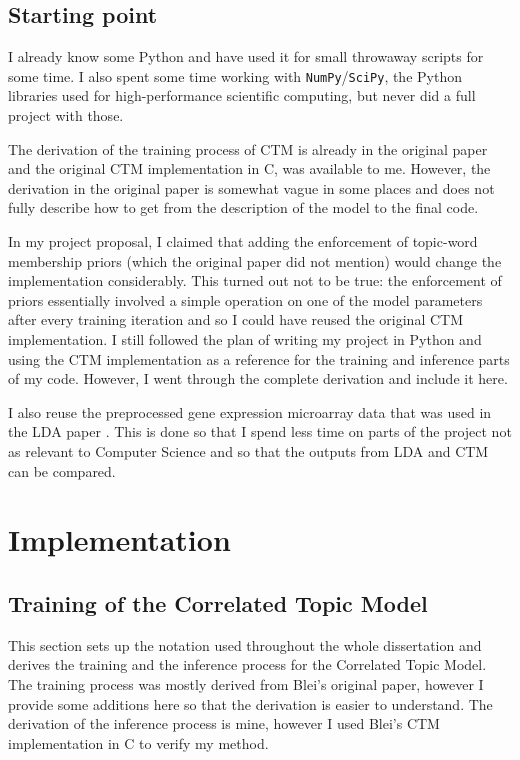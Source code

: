 \documentclass[12pt,a4paper,twoside,openright]{report}
\begin{document}
\section{Starting point}

I already know some Python and have used it for small throwaway scripts for some time. I also spent some time working with \texttt{NumPy}/\texttt{SciPy}, the Python libraries used for high-performance scientific computing, but never did a full project with those.

The derivation of the training process of CTM is already in the original paper \cite{Blei} and the original CTM implementation in C, was available to me. However, the derivation in the original paper is somewhat vague in some places and does not fully describe how to get from the description of the model to the final code.

In my project proposal, I claimed that adding the enforcement of topic-word membership priors (which the original paper did not mention) would change the implementation considerably. This turned out not to be true: the enforcement  of priors essentially involved a simple operation on one of the model parameters after every training iteration and so I could have reused the original CTM implementation. I still followed the plan of writing my project in Python and using the CTM implementation as a reference for the training and inference parts of my code. However, I went through the complete derivation and include it here.

I also reuse the preprocessed gene expression microarray data that was used in the LDA paper \cite{Pratanwanich2014}. This is done so that I spend less time on parts of the project not as relevant to Computer Science and so that the outputs from LDA and CTM can be compared.

\chapter{Implementation}

\section{Training of the Correlated Topic Model}

This section sets up the notation used throughout the whole dissertation and derives the training and the inference process for the Correlated Topic Model. The training process was mostly derived from Blei's original paper, however I provide some additions here so that the derivation is easier to understand. The derivation of the inference process is mine, however I used Blei's CTM implementation in C to verify my method.
\end{document}

